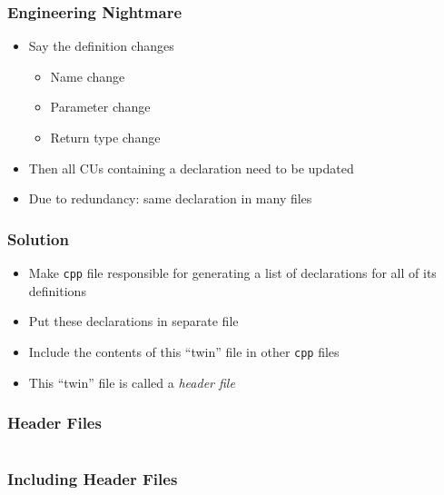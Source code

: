 \documentclass{../ucll-slides}
\begin{document}
\begin{frame}
  \frametitle{Engineering Nightmare}
  \begin{itemize}
    \item Say the definition changes
          \begin{itemize}
            \item Name change
            \item Parameter change
            \item Return type change
          \end{itemize}
    \item Then all CUs containing a declaration need to be updated
    \item Due to redundancy: same declaration in many files
  \end{itemize}
\end{frame}

\begin{frame}
  \frametitle{Solution}
  \begin{itemize}
    \item Make {\tt cpp} file responsible for generating a list of declarations
          for all of its definitions
    \item Put these declarations in separate file
    \item Include the contents of this ``twin'' file in other {\tt cpp} files
    \item This ``twin'' file is called a \emph{header file}
  \end{itemize}
\end{frame}

\begin{frame}
  \frametitle{Header Files}
  \begin{columns}[t]
    \column{5cm}
    \column{5cm}
  \end{columns}
\end{frame}

\begin{frame}
  \frametitle{Including Header Files}
\end{frame}
\end{document}
